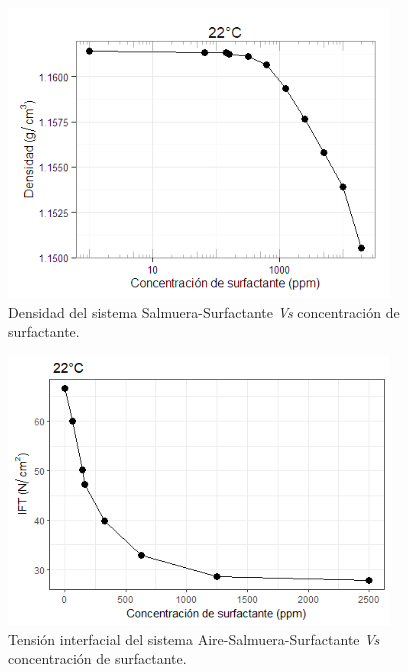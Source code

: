 \begin{figure}
    \centering
    \includegraphics[width=0.9\textwidth]{R_plot/Rplot23.png}
    \caption[Densidad del sistema S-S.]{Densidad del sistema Salmuera-Surfactante \emph{Vs} concentración de surfactante.}
    \label{fig:denAireSS}
\end{figure}

\begin{figure}
    \centering
    \includegraphics[width=0.9\textwidth]{R_plot/Rplot24_cart.png}
    \caption[IFT del sistema Aire-S-S.]{Tensión interfacial del sistema Aire-Salmuera-Surfactante \emph{Vs} concentración de surfactante.}
    \label{fig:IFTAireSS}
\end{figure}



